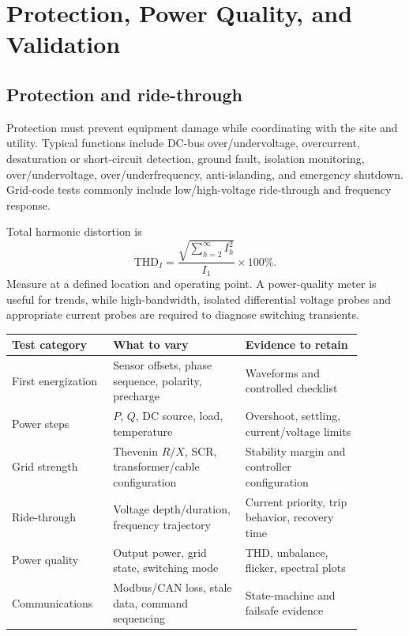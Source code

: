 \documentclass[11pt]{article}
\begin{document}
\section{Protection, Power Quality, and Validation}
\subsection{Protection and ride-through}
Protection must prevent equipment damage while coordinating with the site and utility. Typical functions include DC-bus over/undervoltage, overcurrent, desaturation or short-circuit detection, ground fault, isolation monitoring, over/undervoltage, over/underfrequency, anti-islanding, and emergency shutdown. Grid-code tests commonly include low/high-voltage ride-through and frequency response.

Total harmonic distortion is
\[
\mathrm{THD}_I=\frac{\sqrt{\sum_{h=2}^{\infty}I_h^2}}{I_1}\times100\%.
\]
Measure at a defined location and operating point. A power-quality meter is useful for trends, while high-bandwidth, isolated differential voltage probes and appropriate current probes are required to diagnose switching transients.

\begin{longtable}{p{0.24\linewidth}p{0.34\linewidth}p{0.30\linewidth}}
\toprule
Test category & What to vary & Evidence to retain \\
\midrule
First energization & Sensor offsets, phase sequence, polarity, precharge & Waveforms and controlled checklist \\
Power steps & $P$, $Q$, DC source, load, temperature & Overshoot, settling, current/voltage limits \\
Grid strength & Thevenin $R/X$, SCR, transformer/cable configuration & Stability margin and controller configuration \\
Ride-through & Voltage depth/duration, frequency trajectory & Current priority, trip behavior, recovery time \\
Power quality & Output power, grid state, switching mode & THD, unbalance, flicker, spectral plots \\
Communications & Modbus/CAN loss, stale data, command sequencing & State-machine and failsafe evidence \\
\bottomrule
\end{longtable}
\end{document}
